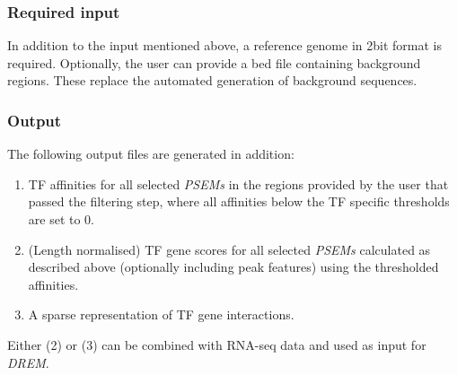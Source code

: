 \documentclass{article}
\begin{document}
\subsubsection*{Required input}
In addition to the input mentioned above, a reference genome in 2bit format is required. 
Optionally, the user can provide a bed file containing background regions. 
These replace the automated generation of background sequences. 

\subsubsection*{Output}
The following output files are generated in addition:
\begin{enumerate}
\item TF affinities for all selected \textit{PSEMs} in the regions provided by the user that passed the filtering step, where all affinities below the TF specific thresholds are set to 0.
\item (Length normalised) TF gene scores for all selected \textit{PSEMs} calculated as described above (optionally including peak features) using the thresholded affinities.
\item A sparse representation of TF gene interactions.
\end{enumerate}

Either (2) or (3) can be combined with RNA-seq data and used as input for \textit{DREM}.



\end{document}

